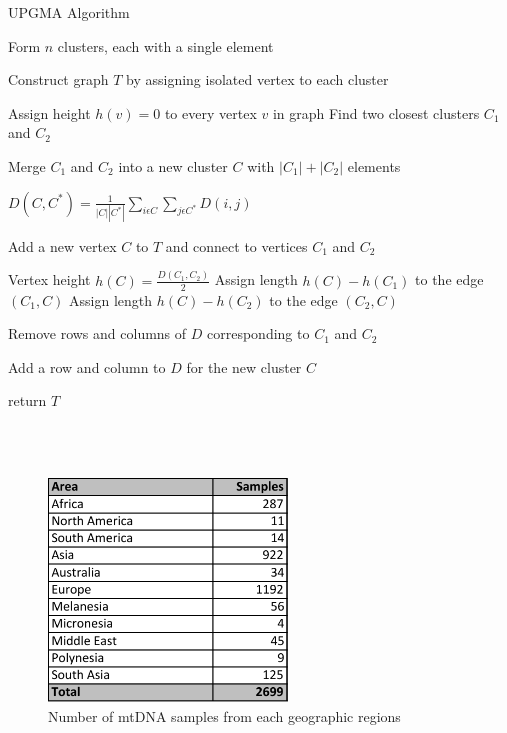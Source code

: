 \documentclass[conference]{IEEEtran}
\begin{document}
\begin{minipage}{\linewidth}
  \begin{algorithm}[H]
    \caption{UPGMA Algorithm}\label{UPGMAAlgorithm}
    \begin{algorithmic}[1]
        \State Form $n$ clusters, each with a single element
        \State \parbox[t]{\dimexpr\linewidth-\algorithmicindent}{Construct graph $T$ by assigning isolated vertex to each cluster\strut}
        \State Assign height $h(v) = 0$ to every vertex $v$ in graph
          \State Find two closest clusters $C_1$ and $C_2$
          \State \parbox[t]{\dimexpr\linewidth-\algorithmicindent}{Merge $C_1$ and $C_2$ into a new cluster $C$ with $\left | C_1 \right | + \left | C_2 \right  |$ elements\strut}
            \State \parbox[t]{\dimexpr\linewidth-\algorithmicindent}{$D(C, C^*) =\frac{1}{\left | C \right | \left | C^* \right |} \sum_{i \epsilon C} \sum_{j \epsilon C^*} D\left (i, j \right )$\strut}
          \EndFor
          \State  \parbox[t]{\dimexpr\linewidth-\algorithmicindent}{Add a new vertex $C$ to $T$ and connect to vertices $C_1$ and $C_2$\strut}
          \State Vertex height $h(C) = \frac{D(C_1, C_2)}{2}$
          \State Assign length $h(C) - h(C_1)$ to the edge $(C_1, C)$
          \State Assign length $h(C) - h(C_2)$ to the edge $(C_2, C)$
          \State \parbox[t]{\dimexpr\linewidth-\algorithmicindent}{Remove rows and columns of $D$ corresponding to $C_1$ and $C_2$\strut}
          \State \parbox[t]{\dimexpr\linewidth-\algorithmicindent}{Add a row and column to $D$ for the new cluster $C$\strut}
        \EndWhile
       \State return $T$
      \EndProcedure
    \end{algorithmic}
  \end{algorithm}
\end{minipage}\\\\

\begin{figure}[!t]
\centering
\includegraphics[width=2.5in]{./figures/DataSize.pdf}
\caption{Number of mtDNA samples from each geographic regions}
\label{DataSize}
\end{figure}
\end{document}
